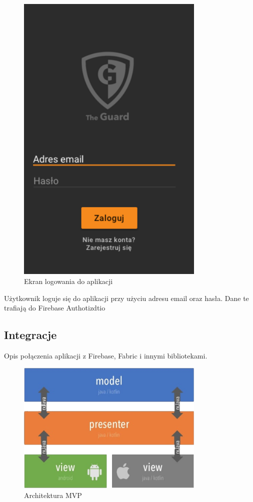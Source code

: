 \begin{figure}[ht]
	\centering
	\includegraphics[width=9cm]{Logowanie}
	\caption{Ekran logowania do aplikacji}
\end{figure}

Użytkownik loguje się do aplikacji przy użyciu adresu email oraz hasła. Dane te trafiają do Firebase Authotizdtio

\subsection*{Integracje}
Opis połączenia aplikacji z Firebase, Fabric i innymi bibliotekami.

\begin{figure}[ht]
    \centering
    \includegraphics[width=9cm]{ios_screenshots/android_architecture.png}
    \caption{Architektura MVP}
\end{figure}

